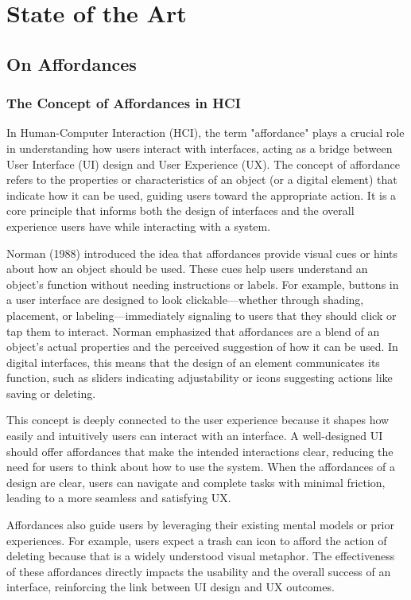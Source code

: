 \section{State of the Art}

\subsection{On Affordances}

\subsubsection{The Concept of Affordances in HCI}

In Human-Computer Interaction (HCI), the term "affordance" plays a crucial role in understanding how users interact with interfaces,
 acting as a bridge between User Interface (UI) design and User Experience (UX).
 The concept of affordance refers to the properties or characteristics of an object (or a digital element) that indicate how it can be used, guiding users toward the appropriate action.
 It is a core principle that informs both the design of interfaces and the overall experience users have while interacting with a system.

Norman (1988) \cite{norman1988psychology} introduced the idea that affordances provide visual cues or hints about how an object should be used.
These cues help users understand an object’s function without needing instructions or labels.
For example, buttons in a user interface are designed to look clickable—whether through shading, placement, or labeling—immediately signaling to users that they should click or tap them to interact.
Norman emphasized that affordances are a blend of an object’s actual properties and the perceived suggestion of how it can be used.
In digital interfaces, this means that the design of an element communicates its function, such as sliders indicating adjustability or icons suggesting actions like saving or deleting.

This concept is deeply connected to the user experience because it shapes how easily and intuitively users can interact with an interface.
A well-designed UI should offer affordances that make the intended interactions clear, reducing the need for users to think about how to use the system. 
When the affordances of a design are clear, users can navigate and complete tasks with minimal friction, leading to a more seamless and satisfying UX.

Affordances also guide users by leveraging their existing mental models or prior experiences.
For example, users expect a trash can icon to afford the action of deleting because that is a widely understood visual metaphor.
The effectiveness of these affordances directly impacts the usability and the overall success of an interface, reinforcing the link between UI design and UX outcomes.

